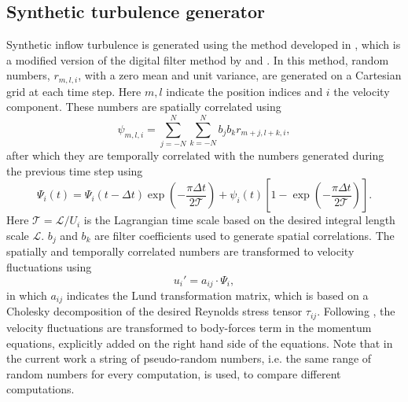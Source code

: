 \documentclass[a4paper,10pt,preprint,3p]{elsarticle}
\begin{document}
\subsection{Synthetic turbulence generator}
\label{sec.turbulenceGeneratorFormulation}
Synthetic inflow turbulence is generated using the method developed in \citet{klapwijk2020evaluation}, which is a modified version of the digital filter method by \citet{xie2008efficient} and \citet{kim2013divergence}. In this method, random numbers, $r_{m,l,i}$, with a zero mean and unit variance, are generated on a Cartesian grid at each time step. Here $m,l$ indicate the position indices and $i$ the velocity component. These numbers are spatially correlated using
\begin{equation}
\psi_{m,l,i} = \sum\limits_{j = -N}^{N}\sum\limits_{k = -N}^{N} b_j b_k r_{m+j,l+k,i},
\end{equation}
after which they are temporally correlated with the numbers generated during the previous time step using
\begin{equation}
\Psi_i\left(t\right) = \Psi_i\left(t - \Delta t\right) \exp\left(-\frac{\pi \Delta t}{2 \mathcal{T}}\right) + \psi_i\left(t\right) \left[1 - \exp\left(-\frac{\pi \Delta t}{2 \mathcal{T}}\right) \right].
\end{equation}
Here $\mathcal{T} = \mathcal{L} / U_i$ is the Lagrangian time scale based on the desired integral length scale $\mathcal{L}$. $b_j$ and $b_k$ are filter coefficients used to generate spatial correlations. The spatially and temporally correlated numbers are transformed to velocity fluctuations using
\begin{equation}\label{eq.uprime}
u_i' = a_{ij} \cdot \Psi_i,
\end{equation}
in which $a_{ij}$ indicates the Lund transformation matrix, which is based on a Cholesky decomposition of the desired Reynolds stress tensor $\tau_{ij}$. Following \citet{klapwijk2020evaluation}, the velocity fluctuations are transformed to body-forces term in the momentum equations, explicitly added on the right hand side of the equations. Note that in the current work a string of pseudo-random numbers, i.e. the same range of random numbers for every computation, is used, to compare different computations.
\end{document}
